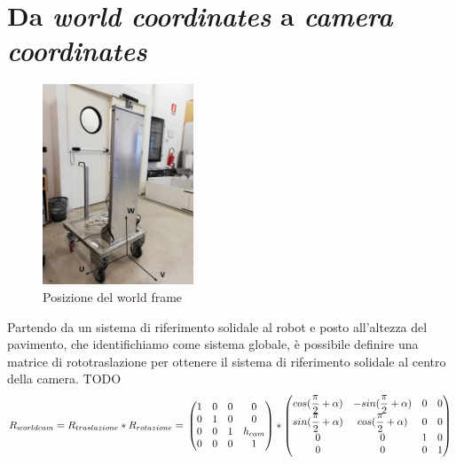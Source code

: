 \section{Da \textit{world coordinates} a \textit{camera coordinates}}
\begin{figure}[H]
	\centering
	\includegraphics[width=0.4\textwidth]{Immagini/SupportoCamera_asse1.jpg}
	\caption{Posizione del world frame}
	\label{fig:worldframe}
\end{figure}

Partendo da un sistema di riferimento solidale al robot e posto all'altezza del pavimento, che identifichiamo come sistema globale, è possibile definire una matrice di rototraslazione per ottenere il sistema di riferimento solidale al centro della camera.
TODO
\begin{equation*}
R_{worldcam} = R_{traslazione} * R_{rotazione} =\\
\begin{pmatrix}
1 & 0 & 0 & 0 \\
0 & 1 & 0 & 0 \\
0 & 0 & 1 & h_{cam} \\
0 & 0 & 0 & 1 \\
\end{pmatrix} *
\begin{pmatrix}
cos(\dfrac{\pi}{2}+\alpha) & -sin(\dfrac{\pi}{2}+\alpha) & 0 & 0 \\
sin(\dfrac{\pi}{2}+\alpha) & cos(\dfrac{\pi}{2}+\alpha)& 0 & 0 \\
0 & 0 & 1 & 0 \\
0 & 0 & 0 & 1 \\
\end{pmatrix}
\end{equation*}

